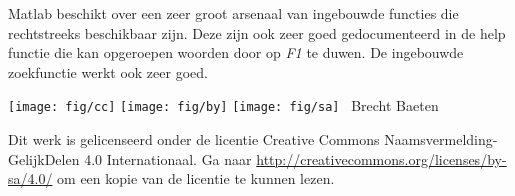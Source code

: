 \documentclass[11pt,twoside]{article}
\begin{document}
Matlab beschikt over een zeer groot arsenaal van ingebouwde functies die rechtstreeks beschikbaar zijn. Deze zijn ook zeer goed gedocumenteerd in de help functie die kan opgeroepen woorden door op \emph{F1} te duwen. De ingebouwde zoekfunctie werkt ook zeer goed.




\vspace{2cm}

\null
\vfill
\texttt{[image: fig/cc]}
\texttt{[image: fig/by]}
\texttt{[image: fig/sa]}
\quad \the\year\ Brecht Baeten
\vspace{0.5cm}

Dit werk is gelicenseerd onder de licentie Creative Commons Naamsvermelding-GelijkDelen 4.0 Internationaal. Ga naar \url{http://creativecommons.org/licenses/by-sa/4.0/} om een kopie van de licentie te kunnen lezen.
\vspace{1cm}
\end{document}
